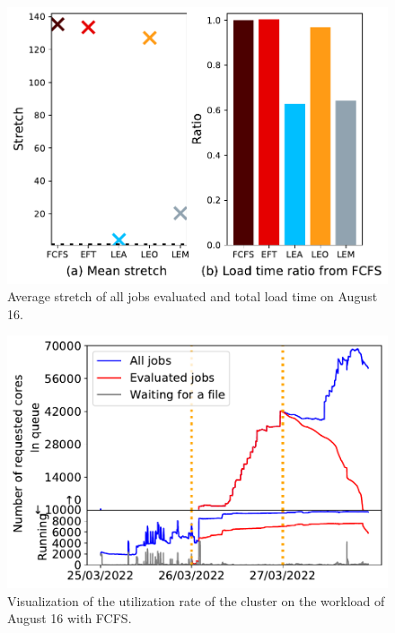 \documentclass[conference,10pt]{IEEEtran}
\begin{document}
\begin{figure}[t]\centering\includegraphics[width=1\linewidth]{../MBSS/plot/Results_FCFS_Score_Backfill_2022-08-16->2022-08-16_V10000_Mean_Stretch_Total_waiting_for_a_load_time_and_transfer_time_450_128_32_256_4_1024.pdf}\caption{Average stretch of all jobs evaluated and total load time on August 16.}\label{stretch.08-16}\end{figure}
\begin{figure}[t]\centering\includegraphics[width=1\linewidth]{../MBSS/plot/Cluster_usage/2022-08-16->2022-08-16_V10000_Fcfs_Used_nodes_Reduced_450_128_32_256_4_1024_core_by_core.pdf}\caption{Visualization of the utilization rate of the cluster on the workload of August 16 with FCFS.}
\label{cluster_usage.08-16_fcfs}\end{figure}
\end{document}
